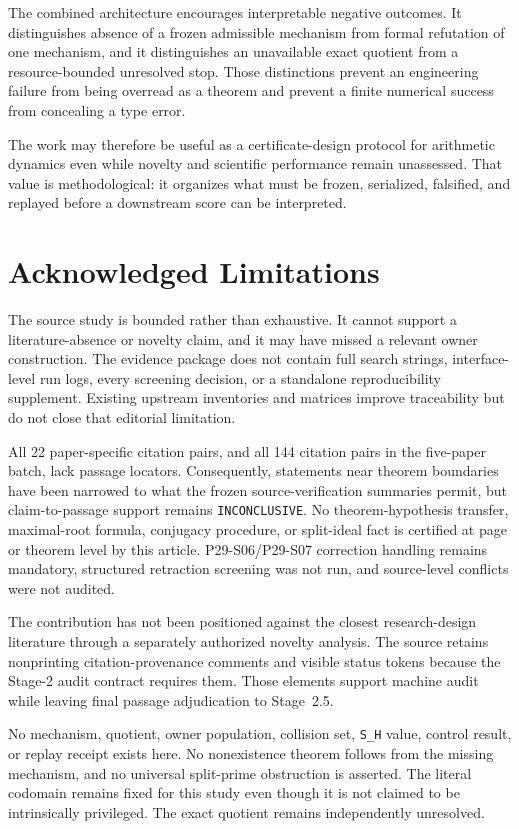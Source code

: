 \documentclass[11pt,a4paper]{article}
\begin{document}
The combined architecture encourages interpretable negative outcomes. It distinguishes absence of a frozen admissible mechanism from formal refutation of one mechanism, and it distinguishes an unavailable exact quotient from a resource-bounded unresolved stop. Those distinctions prevent an engineering failure from being overread as a theorem and prevent a finite numerical success from concealing a type error.

The work may therefore be useful as a certificate-design protocol for arithmetic dynamics even while novelty and scientific performance remain unassessed. That value is methodological: it organizes what must be frozen, serialized, falsified, and replayed before a downstream score can be interpreted.

\section{Acknowledged Limitations}

The source study is bounded rather than exhaustive. It cannot support a literature-absence or novelty claim, and it may have missed a relevant owner construction. The evidence package does not contain full search strings, interface-level run logs, every screening decision, or a standalone reproducibility supplement. Existing upstream inventories and matrices improve traceability but do not close that editorial limitation.

All 22 paper-specific citation pairs, and all 144 citation pairs in the five-paper batch, lack passage locators. Consequently, statements near theorem boundaries have been narrowed to what the frozen source-verification summaries permit, but claim-to-passage support remains \texttt{INCONCLUSIVE}. No theorem-hypothesis transfer, maximal-root formula, conjugacy procedure, or split-ideal fact is certified at page or theorem level by this article. P29-S06/P29-S07 correction handling remains mandatory, structured retraction screening was not run, and source-level conflicts were not audited.

The contribution has not been positioned against the closest research-design literature through a separately authorized novelty analysis. The source retains nonprinting citation-provenance comments and visible status tokens because the Stage-2 audit contract requires them. Those elements support machine audit while leaving final passage adjudication to Stage~2.5.

No mechanism, quotient, owner population, collision set, \texttt{S\_H} value, control result, or replay receipt exists here. No nonexistence theorem follows from the missing mechanism, and no universal split-prime obstruction is asserted. The literal codomain remains fixed for this study even though it is not claimed to be intrinsically privileged. The exact quotient remains independently unresolved.
\end{document}
